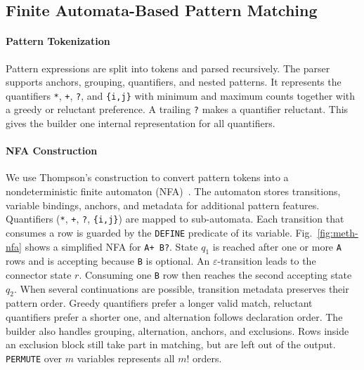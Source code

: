 \documentclass[preprint,12pt,times,a4paper]{elsarticle}
\begin{document}
\subsection{Finite Automata-Based Pattern Matching}

\paragraph{Pattern Tokenization}
Pattern expressions are split into tokens and parsed recursively. The parser
supports anchors, grouping, quantifiers, and nested patterns. It represents
the quantifiers \texttt{*},
\texttt{+}, \texttt{?}, and \texttt{\{i,j\}} with minimum and maximum counts
together with a greedy or reluctant preference. A trailing \texttt{?}
makes a quantifier reluctant. This gives the builder one internal
representation for all quantifiers.

\paragraph{NFA Construction}
We use Thompson's construction to convert pattern tokens into a
nondeterministic finite automaton (NFA)~\cite{Thompson1968,HopcroftUllman}.
The automaton stores transitions, variable bindings, anchors, and metadata
for additional pattern features. Quantifiers (\texttt{*}, \texttt{+},
\texttt{?}, \texttt{\{i,j\}}) are mapped to sub-automata. Each transition
that consumes a row is guarded by the \texttt{DEFINE} predicate of its
variable. Fig.~\ref{fig:meth-nfa} shows a simplified NFA for
\texttt{A+ B?}. State $q_1$ is reached after one or more \texttt{A} rows and is
accepting because \texttt{B} is optional. An $\varepsilon$-transition leads
to the connector state $r$. Consuming one \texttt{B} row then reaches the
second accepting state $q_2$. When several continuations are possible, transition
metadata preserves their pattern order. Greedy quantifiers prefer a longer
valid match, reluctant quantifiers prefer a shorter one, and alternation follows
declaration order. The builder also handles grouping, alternation, anchors,
and exclusions. Rows inside an exclusion block still take part in matching,
but are left out of the output. \texttt{PERMUTE} over $m$ variables represents all
$m!$ orders.
\end{document}

